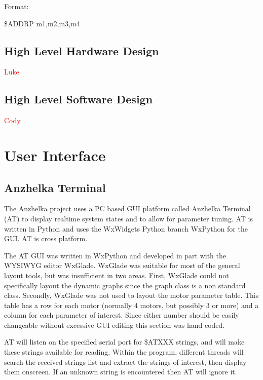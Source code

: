 \documentclass{article}
\numberwithin{equation}{section} %
\begin{document}
Format: 

\$ADDRP m1,m2,m3,m4



\subsection{High Level Hardware Design}
\textcolor{red}{Luke}

\subsection{High Level Software Design}
\textcolor{red}{Cody}

 
\section{User Interface}

\subsection{Anzhelka Terminal}
The Anzhelka project uses a PC based GUI platform called Anzhelka Terminal (AT) to display realtime system states and to allow for parameter tuning. AT is written in Python and uses the WxWidgets Python branch WxPython for the GUI. AT is cross platform.

The AT GUI was written in WxPython and developed in part with the WYSIWYG editor WxGlade. WxGlade was suitable for most of the general layout tools, but was insufficient in two areas. First, WxGlade could not specifically layout the dynamic graphs since the graph class is a non standard class. Secondly, WxGlade was not used to layout the motor parameter table. This table has a row for each motor (normally 4 motors, but possibly 3 or more) and a column for each parameter of interest. Since either number should be easily changeable without excessive GUI editing this section was hand coded.

AT will listen on the specified serial port for \$ATXXX strings, and will  make these strings available for reading. Within the program, different threads will search the received strings list and extract the strings of interest, then display them onscreen. If an unknown string is encountered then AT will ignore it.
\end{document}
